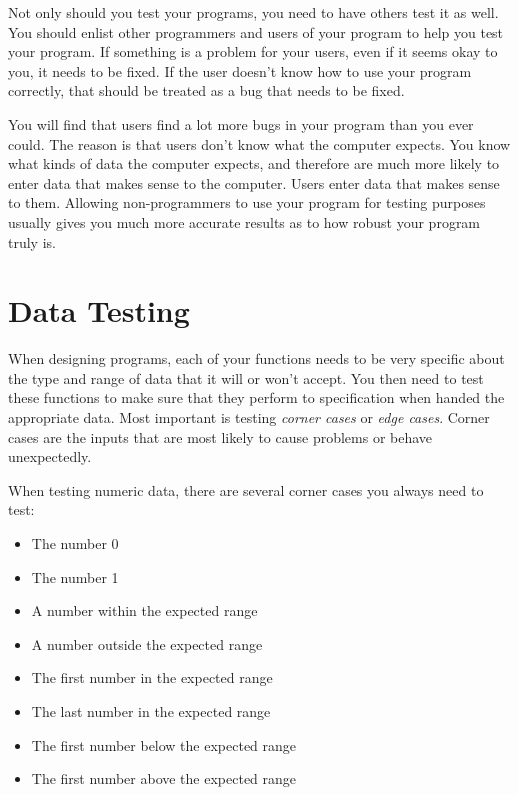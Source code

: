 Not only should you test your programs, you need to have others test it as 
well.  You should enlist other programmers and users of your program to 
help you test your program.  If something is a problem for your users, 
even if it seems okay to you, it needs to be fixed.  If the user doesn't 
know how to use your program correctly, that should be treated as a bug 
that needs to be fixed.

You will find that users find a lot more bugs in your program than you
ever could.  The reason is that users don't know what the computer
expects.  You know what kinds of data the computer expects, and therefore
are much more likely to enter data that makes sense to the computer.  Users
enter data that makes sense to them.  Allowing non-programmers to use
your program for testing
purposes usually gives you much more accurate results as to how robust
your program truly is.

\section{Data Testing}

When designing programs, each of your functions needs to be very specific
about the type and range of data that it will or won't accept.  You then
need to test these functions to make sure that they perform to specification
when handed the appropriate data.
Most important is testing \emph{corner cases} or 
\emph{edge cases}.  
Corner cases are the inputs that are most likely to cause problems or behave unexpectedly.

When testing numeric data, there are several corner cases you always 
need to test:

\begin{itemize}\item The number 0 
\item The number 1 
\item A number within the expected range 
\item A number outside the expected range 
\item The first number in the expected range 
\item The last number in the expected range 
\item The first number below the expected range 
\item The first number above the expected range 
\end{itemize}

